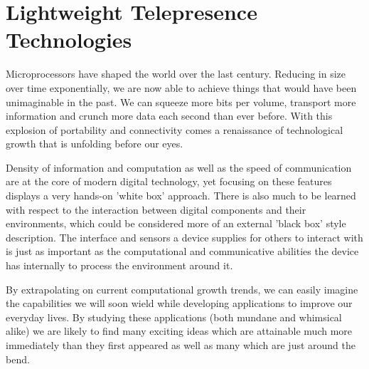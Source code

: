 \documentclass[a4paper,12pt]{report}
\begin{document}

\chapter{Lightweight Telepresence Technologies}

Microprocessors have shaped the world over the last century. Reducing in size over time exponentially, we are now able to achieve things that would have been unimaginable in the past. We can squeeze more bits per volume, transport more information and crunch more data each second than ever before. With this explosion of portability and connectivity comes a renaissance of technological growth that is unfolding before our eyes.

Density of information and computation as well as the speed of communication are at the core of modern digital technology, yet focusing on these features displays a very hands-on 'white box' approach. There is also much to be learned with respect to the interaction between digital components and their environments, which could be considered more of an external 'black box' style description. The interface and sensors a device supplies for others to interact with is just as important as the computational and communicative abilities the device has internally to process the environment around it.

By extrapolating on current computational growth trends, we can easily imagine the capabilities we will soon wield while developing applications to improve our everyday lives. By studying these applications (both mundane and whimsical alike) we are likely to find many exciting ideas which are attainable much more immediately than they first appeared as well as many which are just around the bend.
\end{document}
